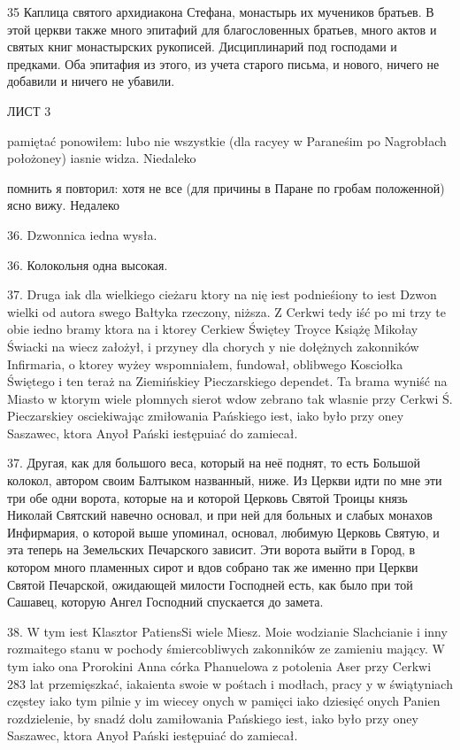 35 Каплица святого архидиакона Стефана, монастырь их мучеников братьев. В этой церкви также много эпитафий для благословенных братьев, много актов и святых книг монастырских рукописей. Дисциплинарий под господами и предками. Оба эпитафия из этого, из учета старого письма, и нового, ничего не добавили и ничего не убавили.


ЛИСТ 3

pamiętać ponowiłem: lubo nie wszystkie (dla racyey w Paraneśim po Nagrobłach położoney) iasnie widza. Niedaleko

помнить я повторил: хотя не все (для причины в Паране по гробам положенной) ясно вижу. Недалеко

36. Dzwonnica iedna wysła.

36. Колокольня одна высокая.

37. Druga iak dla wielkiego cieżaru ktory na nię iest podnieśiony to iest Dzwon wielki od autora swego Bałtyka rzeczony, niższa. Z Cerkwi tedy iść po mi trzy te obie iedno bramy ktora na i ktorey Cerkiew Świętey Troyce Książę Mikołay Świacki na wiecz założył, i przyney dla chorych y nie dołężnych zakonników Infirmaria, o ktorey wyżey wspomniałem, fundował, oblibwego Kosciołka Świętego i ten teraż na Ziemińskiey Pieczarskiego dependet. Ta brama wyniść na Miasto w ktorym wiele płomnych sierot wdow zebrano tak wlasnie przy Cerkwi Ś. Pieczarskiey osciekiwając zmiłowania Pańskiego iest, iako było przy oney Saszawec, ktora Anyoł Pański iestępuiać do zamiecał.

37. Другая, как для большого веса, который на неё поднят, то есть Большой колокол, автором своим Балтыком названный, ниже. Из Церкви идти по мне эти три обе одни ворота, которые на и которой Церковь Святой Троицы князь Николай Святский навечно основал, и при ней для больных и слабых монахов Инфирмария, о которой выше упоминал, основал, любимую Церковь Святую, и эта теперь на Земельских Печарского зависит. Эти ворота выйти в Город, в котором много пламенных сирот и вдов собрано так же именно при Церкви Святой Печарской, ожидающей милости Господней есть, как было при той Сашавец, которую Ангел Господний спускается до замета.


38. W tym iest Klasztor PatiensSi wiele Miesz. Moie wodzianie Slachcianie i inny rozmaitego stanu w pochody śmiercobliwych zakonników ze zamieniu mający. W tym iako ona Prorokini Anna córka Phanuelowa z potolenia Aser przy Cerkwi 283 lat przemięszkać, iakaienta swoie w pośtach i modłach, pracy y w świątyniach częstey iako tym pilnie y im wiecey onych w pamięci iako dziesięć onych Panien rozdzielenie, by snadź dolu zamiłowania Pańskiego iest, iako było przy oney Saszawec, ktora Anyoł Pański iestępuiać do zamiecał.

